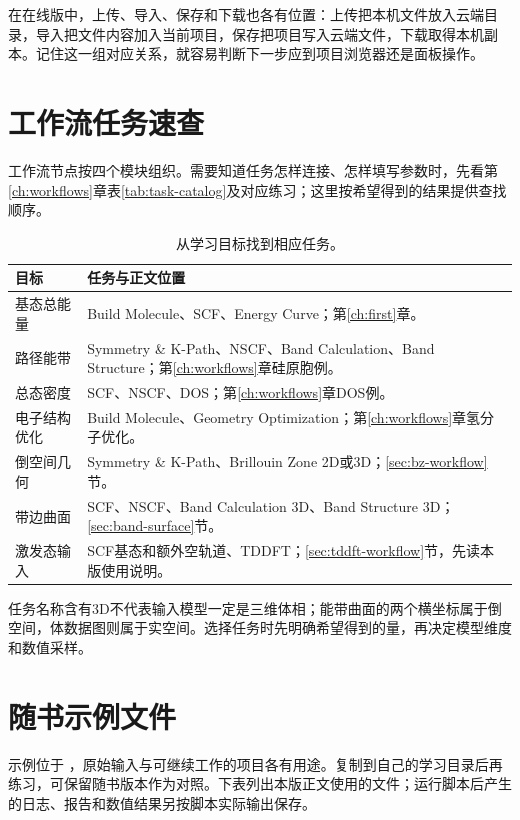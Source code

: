 在在线版中，上传、导入、保存和下载也各有位置：上传把本机文件放入云端目录，导入把文件内容加入当前项目，保存把项目写入云端文件，下载取得本机副本。记住这一组对应关系，就容易判断下一步应到项目浏览器还是面板操作。

\section{工作流任务速查}

工作流节点按四个模块组织。需要知道任务怎样连接、怎样填写参数时，先看第\ref{ch:workflows}章表\ref{tab:task-catalog}及对应练习；这里按希望得到的结果提供查找顺序。

\begin{table}[htbp]
\centering
\caption{从学习目标找到相应任务。}
\begin{tabularx}{\linewidth}{lX}
\toprule
目标 & 任务与正文位置 \\
\midrule
基态总能量 & Build Molecule、SCF、Energy Curve；第\ref{ch:first}章。 \\
路径能带 & Symmetry \& K-Path、NSCF、Band Calculation、Band Structure；第\ref{ch:workflows}章硅原胞例。 \\
总态密度 & SCF、NSCF、DOS；第\ref{ch:workflows}章DOS例。 \\
电子结构优化 & Build Molecule、Geometry Optimization；第\ref{ch:workflows}章氢分子优化。 \\
倒空间几何 & Symmetry \& K-Path、Brillouin Zone 2D或3D；\ref{sec:bz-workflow}节。 \\
带边曲面 & SCF、NSCF、Band Calculation 3D、Band Structure 3D；\ref{sec:band-surface}节。 \\
激发态输入 & SCF基态和额外空轨道、TDDFT；\ref{sec:tddft-workflow}节，先读本版使用说明。 \\
\bottomrule
\end{tabularx}
\end{table}

任务名称含有3D不代表输入模型一定是三维体相；能带曲面的两个横坐标属于倒空间，体数据图则属于实空间。选择任务时先明确希望得到的量，再决定模型维度和数值采样。


\section{随书示例文件}

示例位于 ，原始输入与可继续工作的项目各有用途。复制到自己的学习目录后再练习，可保留随书版本作为对照。下表列出本版正文使用的文件；运行脚本后产生的日志、报告和数值结果另按脚本实际输出保存。

